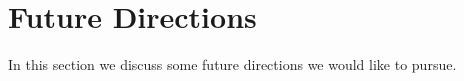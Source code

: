 \chapter{Future Directions}
\label{chap:future}

In this section we discuss some future directions we would like to pursue.




